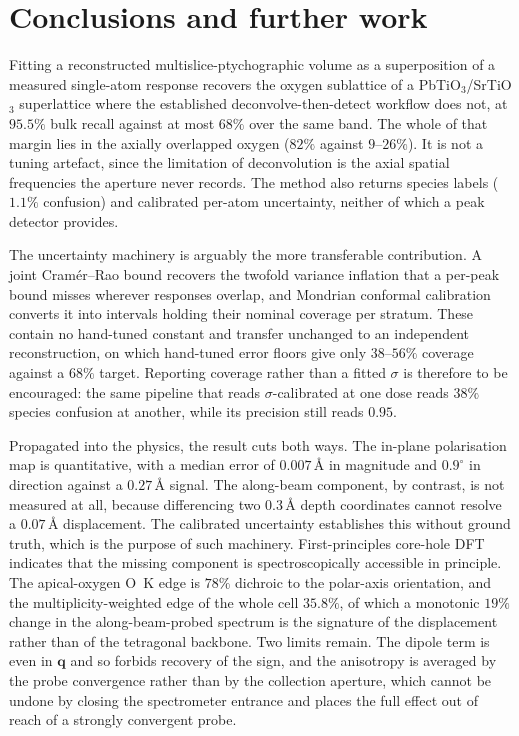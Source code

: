 \documentclass[aps,prb,twocolumn,superscriptaddress,floatfix,nofootinbib]{revtex4-2}
\begin{document}
\section{Conclusions and further work}

Fitting a reconstructed multislice-ptychographic volume as a superposition of a measured
single-atom response recovers the oxygen sublattice of a PbTiO$_3$/SrTiO$_3$ superlattice where
the established deconvolve-then-detect workflow does not, at $95.5\%$ bulk recall against at
most $68\%$ over the same band. The whole of that margin lies in the axially overlapped oxygen ($82\%$ against
$9$--$26\%$). It is not a tuning artefact, since the limitation of deconvolution is the axial
spatial frequencies the aperture never records. The method also returns species labels ($1.1\%$
confusion) and calibrated per-atom uncertainty, neither of which a peak detector provides.

The uncertainty machinery is arguably the more transferable contribution. A joint
Cram\'er--Rao bound recovers the twofold variance inflation that a per-peak bound misses wherever
responses overlap, and Mondrian conformal calibration converts it into intervals holding their
nominal coverage per stratum. These contain no hand-tuned constant and transfer unchanged to an
independent reconstruction, on which hand-tuned error floors give only $38$--$56\%$ coverage
against a $68\%$ target. Reporting coverage rather than a fitted $\sigma$ is therefore to be
encouraged: the same pipeline that reads $\sigma$-calibrated at one dose reads $38\%$ species
confusion at another, while its precision still reads $0.95$.

Propagated into the physics, the result cuts both ways. The in-plane polarisation map is
quantitative, with a median error of $0.007$\,\AA{} in magnitude and $0.9^\circ$ in direction
against a $0.27$\,\AA{} signal. The along-beam component, by contrast, is not measured at all,
because differencing two $0.3$\,\AA{} depth coordinates cannot resolve a $0.07$\,\AA{}
displacement. The calibrated uncertainty establishes this without ground truth, which is the
purpose of such machinery. First-principles core-hole DFT indicates that the missing component is
spectroscopically accessible in principle. The apical-oxygen O~K edge is $78\%$ dichroic to the
polar-axis orientation, and the multiplicity-weighted edge of the whole cell $35.8\%$, of which a
monotonic $19\%$ change in the along-beam-probed spectrum is the signature of the displacement
rather than of the tetragonal backbone. Two limits remain. The dipole term is even in
$\mathbf{q}$ and so forbids recovery of the sign, and the anisotropy is averaged by the probe
convergence rather than by the collection aperture, which cannot be undone by closing the
spectrometer entrance and places the full effect out of reach of a strongly convergent probe.
\end{document}
